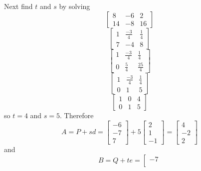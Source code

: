 \documentclass{article}
\begin{document}
\begin{Answer}
Next find $t$ and $s$ by solving
\begin{equation*}
\left[
\begin{array}{cc|c}
8 & -6 & 2\\
14 & -8 & 16
\end{array}
\right]
\end{equation*}
\begin{equation*}
\left[
\begin{array}{cc|c}
1 & \frac{-3}{4} & \frac{1}{4}\\
7 & -4 & 8
\end{array}
\right]
\end{equation*}
\begin{equation*}
\left[
\begin{array}{cc|c}
1 & \frac{-3}{4} & \frac{1}{4}\\
0 & \frac{5}{4} & \frac{25}{4}
\end{array}
\right]
\end{equation*}
\begin{equation*}
\left[
\begin{array}{cc|c}
1 & \frac{-3}{4} & \frac{1}{4}\\
0 & 1 & 5
\end{array}
\right]
\end{equation*}
\begin{equation*}
\left[
\begin{array}{cc|c}
1 & 0 & 4\\
0 & 1 & 5
\end{array}
\right]
\end{equation*}
so $t = 4$ and $s = 5$.
Therefore
\begin{equation*}
A = P+sd = \left[
\begin{array}{c}
-6\\
-7\\
7
\end{array}
\right] + 5 \left[
\begin{array}{c}
2\\
1\\
-1
\end{array}
\right] = \left[
\begin{array}{c}
4\\
-2\\
2
\end{array}
\right]
\end{equation*}
and 
\begin{equation*}
B = Q+te = \left[
\begin{array}{c}
-7\\

\end{array}
\end{equation*}
\end{Answer}
\end{document}

